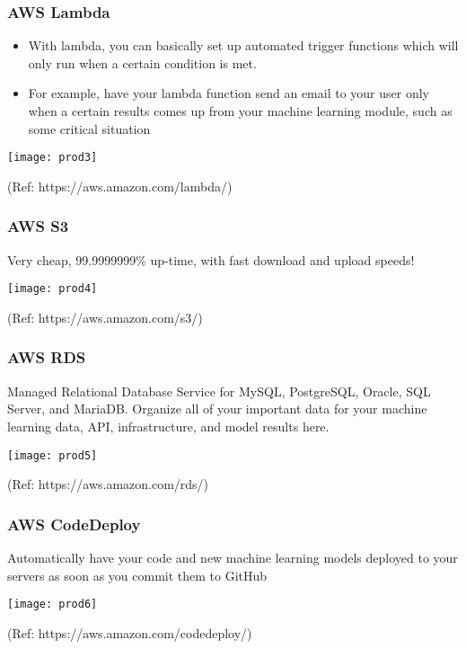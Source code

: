 \begin{frame}\frametitle{AWS Lambda}
\begin{itemize}
\item With lambda, you can basically set up automated trigger functions which will only run when a certain condition is met. 
\item For example, have your lambda function send an email to your user only when a certain results comes up from your machine learning module, such as some critical situation
\end{itemize}

\begin{center}
\texttt{[image: prod3]}
\end{center}

{\tiny (Ref: https://aws.amazon.com/lambda/)}


\end{frame}

\begin{frame}\frametitle{AWS S3}
Very cheap, 99.9999999\% up-time, with fast download and upload speeds!

\begin{center}
\texttt{[image: prod4]}
\end{center}

{\tiny (Ref: https://aws.amazon.com/s3/)}

\end{frame}

\begin{frame}\frametitle{AWS RDS}
Managed Relational Database Service for MySQL, PostgreSQL, Oracle, SQL Server, and MariaDB. Organize all of your important data for your machine learning data, API, infrastructure, and model results here.

\begin{center}
\texttt{[image: prod5]}
\end{center}

{\tiny (Ref: https://aws.amazon.com/rds/)}

\end{frame}

\begin{frame}\frametitle{AWS CodeDeploy}
Automatically have your code and new machine learning models deployed to your servers as soon as you commit them to GitHub

\begin{center}
\texttt{[image: prod6]}
\end{center}

{\tiny (Ref: https://aws.amazon.com/codedeploy/)}

\end{frame}



